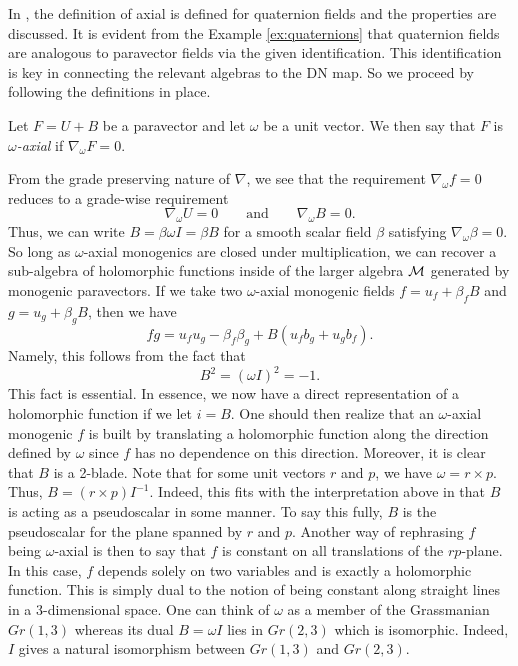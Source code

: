In \cite{belishev_algebras_2017, belishev_algebras_2019}, the definition of axial is defined for quaternion fields and the properties are discussed.  It is evident from the Example \ref{ex:quaternions} that quaternion fields are analogous to paravector fields via the given identification.  This identification is key in connecting the relevant algebras to the DN map. So we proceed by following the definitions in place.  

\begin{definition}
    Let $F=U+B$ be a paravector and let $\omega$ be a unit vector.  We then say that $F$ is \emph{$\omega$-axial} if $\nabla_\omega F = 0$.  
\end{definition}


From the grade preserving nature of $\nabla$, we see that the requirement $\nabla_\omega f=0$ reduces to a grade-wise requirement
\[
\nabla_\omega U = 0 \qquad \textrm{and} \qquad \nabla_\omega B = 0.
\]
Thus, we can write $B=\beta \omega I = \beta B$ for a smooth scalar field $\beta$ satisfying $\nabla_\omega \beta =0$. So long as $\omega$-axial monogenics are closed under multiplication, we can recover a sub-algebra of holomorphic functions inside of the larger algebra $\mathcal{M}$ generated by monogenic paravectors. If we take two $\omega$-axial monogenic fields $f=u_f + \beta_f B$ and $g=u_g + \beta_g B$, then we have
\begin{equation}
\label{eq:axial_multiplication}
fg = u_f u_g - \beta_f \beta_g + B (u_f b_g + u_g b_f).
\end{equation}
Namely, this follows from the fact that
\[
B^2 = (\omega I)^2 = -1.
\]
This fact is essential. In essence, we now have a direct representation of a holomorphic function if we let $i=B$.  One should then realize that an $\omega$-axial monogenic $f$ is built by translating a holomorphic function along the direction defined by $\omega$ since $f$ has no dependence on this direction. Moreover, it is clear that $B$ is a 2-blade.  Note that for some unit vectors $r$ and $p$, we have $\omega = r \times p$.  Thus, $B =  (r \times p)I^{-1}$.  Indeed, this fits with the interpretation above in that $B$ is acting as a pseudoscalar in some manner.  To say this fully, $B$ is the pseudoscalar for the plane spanned by $r$ and $p$. Another way of rephrasing $f$ being $\omega$-axial is then to say that $f$ is constant on all translations of the $r p$-plane. In this case, $f$ depends solely on two variables and is exactly a holomorphic function. This is simply dual to the notion of being constant along straight lines in a 3-dimensional space.  One can think of $\omega$ as a member of the Grassmanian $Gr(1,3)$ whereas its dual $B=\omega I$ lies in $Gr(2,3)$ which is isomorphic. Indeed, $I$ gives a natural isomorphism between $Gr(1,3)$ and $Gr(2,3)$.

